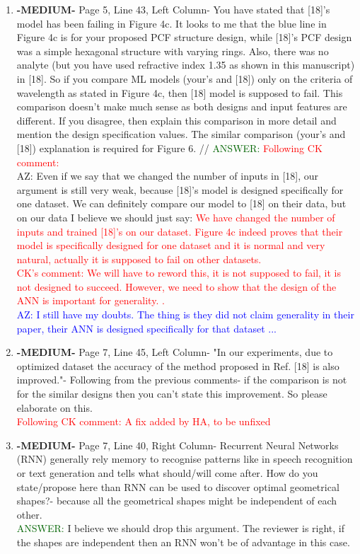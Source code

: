 \documentclass{article}
\begin{document}
\begin{enumerate}
 \item \textbf{-MEDIUM-} Page 5, Line 43, Left Column- You have stated that [18]'s model has been failing in Figure 4c. It looks to me that the blue line in Figure 4c is for your proposed PCF structure design, while [18]'s PCF design was a simple hexagonal structure with varying rings. Also, there was no analyte (but you have used refractive index 1.35 as shown in this manuscript) in [18]. So if you compare ML models (your's and [18]) only on the criteria of wavelength as stated in Figure 4c, then [18] model is supposed to fail. This comparison doesn't make much sense as both designs and input features are different. If you disagree, then explain this comparison in more detail and mention the design specification values.
The similar comparison (your's and [18]) explanation is required for Figure 6. //
\textcolor{darkgreen}{ANSWER:} \textcolor{red}{Following CK comment: } \\ AZ: Even if we say that we changed the number of inputs in [18], our argument is still very weak, because [18]'s model is designed specifically for one dataset. We can definitely compare our model to [18] on their data, but on our data I believe we should just say: \textcolor{red} {We have changed the number of inputs and trained [18]'s on our dataset. Figure 4c indeed proves that their model is specifically designed for one dataset and it is normal and very natural, actually it is supposed to fail on other datasets.} \\ \textcolor{red}{CK's comment: We will have to reword this, it is not supposed to fail, it is not designed to succeed. However, we need to show that the design of the ANN is important for generality. .} \\ \textcolor{blue}{AZ: I still have my doubts. The thing is they did not claim generality in their paper, their ANN is designed specifically for that dataset ...}

\item \textbf{-MEDIUM-} Page 7, Line 45, Left Column- "In our experiments, due to optimized dataset the accuracy of the method proposed in Ref. [18] is also improved."- Following from the previous comments- if the comparison is not for the similar designs then you can't state this improvement. So please elaborate on this. \\
\textcolor{red}{Following CK comment: A fix added by HA, to be unfixed}

\item \textbf{-MEDIUM-} Page 7, Line 40, Right Column- Recurrent Neural Networks (RNN) generally rely memory to recognise patterns like in speech recognition or text generation and tells what should/will come after. How do you state/propose here than RNN can be used to discover optimal geometrical shapes?- because all the geometrical shapes might be independent of each other. \\
\textcolor{darkgreen}{ANSWER: } I believe we should drop this argument. The reviewer is right, if the shapes are independent then an RNN won't be of advantage in this case. \\


\end{enumerate}
\end{document}
